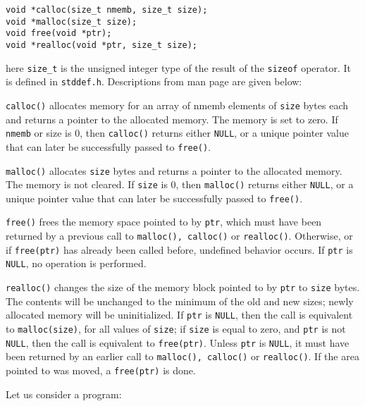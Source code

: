 \begin{verbatim}
void *calloc(size_t nmemb, size_t size);
void *malloc(size_t size);
void free(void *ptr);
void *realloc(void *ptr, size_t size);
\end{verbatim}

here \texttt{size\_t} is the unsigned integer type of the result of the
\texttt{sizeof} operator. It is defined in \texttt{stddef.h}.
Descriptions from man page are given below:

\texttt{calloc()} allocates memory for an array of nmemb elements of
\texttt{size} bytes each and returns a pointer to the allocated memory. The
memory is set to zero. If \texttt{nmemb} or size is 0, then \texttt{calloc()}
returns either \texttt{NULL}, or a unique pointer value that can later be
successfully passed to \texttt{free()}.

\texttt{malloc()} allocates \texttt{size} bytes and returns a pointer to the
allocated memory. The memory is not cleared. If \texttt{size} is 0, then
\texttt{malloc()} returns either \texttt{NULL}, or a unique pointer value that
can later be successfully passed to \texttt{free()}.

\texttt{free()} frees the memory space pointed to by \texttt{ptr}, which must
have been returned by a previous call to \texttt{malloc(), calloc()} or
\texttt{realloc()}. Otherwise, or if \texttt{free(ptr)} has already been called
before, undefined behavior occurs. If \texttt{ptr} is \texttt{NULL}, no
operation is performed.

\texttt{realloc()} changes the size of the memory block pointed to by
\texttt{ptr} to \texttt{size} bytes. The contents will be unchanged to the
minimum of the old and new sizes; newly allocated memory will be
uninitialized. If \texttt{ptr} is \texttt{NULL}, then the call is equivalent to
\texttt{malloc(size)}, for all values of \texttt{size}; if \texttt{size} is
equal to zero, and \texttt{ptr} is not \texttt{NULL}, then the call is
equivalent to \texttt{free(ptr)}. Unless \texttt{ptr} is \texttt{NULL}, it must
have been returned by an earlier call to \texttt{malloc(), calloc()} or
\texttt{realloc()}. If the area pointed to was moved, a \texttt{free(ptr)} is
done.

Let us consider a program:

